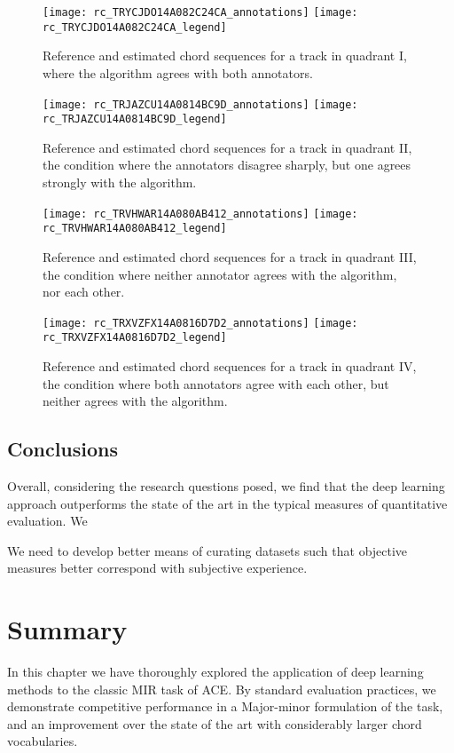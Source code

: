 \begin{figure}[t]
\centering
\texttt{[image: rc\_TRYCJDO14A082C24CA\_annotations]}
\texttt{[image: rc\_TRYCJDO14A082C24CA\_legend]}
\caption{Reference and estimated chord sequences for a track in quadrant I, where the algorithm agrees with both annotators.}
\label{fig:rc_quadI}
\end{figure}

\begin{figure}[t]
\centering
\texttt{[image: rc\_TRJAZCU14A0814BC9D\_annotations]}
\texttt{[image: rc\_TRJAZCU14A0814BC9D\_legend]}
\caption{Reference and estimated chord sequences for a track in quadrant II, the condition where the annotators disagree sharply, but one agrees strongly with the algorithm.}
\label{fig:rc_quadII}
\end{figure}

\begin{figure}[t]
\centering
\texttt{[image: rc\_TRVHWAR14A080AB412\_annotations]}
\texttt{[image: rc\_TRVHWAR14A080AB412\_legend]}
\caption{Reference and estimated chord sequences for a track in quadrant III, the condition where neither annotator agrees with the algorithm, nor each other.}
\label{fig:rc_quadIII}
\end{figure}

\begin{figure}[t]
\centering
\texttt{[image: rc\_TRXVZFX14A0816D7D2\_annotations]}
\texttt{[image: rc\_TRXVZFX14A0816D7D2\_legend]}
\caption{Reference and estimated chord sequences for a track in quadrant IV, the condition where both annotators agree with each other, but neither agrees with the algorithm.}
\label{fig:rc_quadIV}
\end{figure}





\subsection{Conclusions}
\label{subsec:conclusions}

Overall, considering the research questions posed, we find that the deep learning approach outperforms the state of the art in the typical measures of quantitative evaluation.
We

We need to develop better means of curating datasets such that objective measures better correspond with subjective experience.


\section{Summary}
\label{sec:summary}

In this chapter we have thoroughly explored the application of deep learning methods to the classic MIR task of ACE.
By standard evaluation practices, we demonstrate competitive performance in a Major-minor formulation of the task, and an improvement over the state of the art with considerably larger chord vocabularies.
